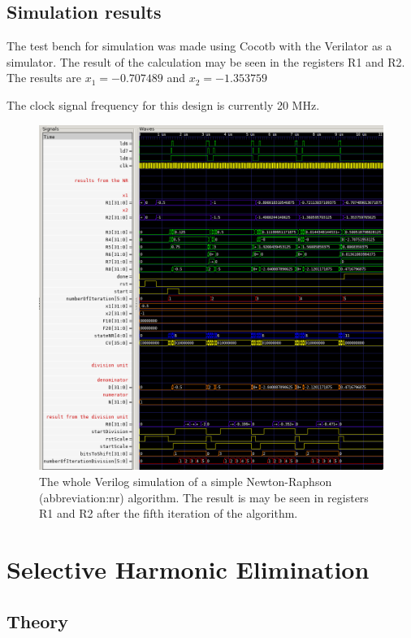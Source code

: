 \documentclass[a4paper, twoside, 11pt]{article}
\begin{document}
    \subsection{Simulation results}
        The test bench for simulation was made using Cocotb \cite{cocotb} with the Verilator \cite{verilator} as a simulator. The result of the calculation may be seen in the registers R1 and R2. The results are $x_1 = - 0.707489$ and $x_2 = - 1.353759$\par
        The clock signal frequency for this design is currently 20 MHz.
            \begin{figure}[htbp!]
                \centering
                \includegraphics[width=1\textwidth]{src/png/simple-nr-sim.png}
                \caption{The whole Verilog simulation of a simple Newton-Raphson (\gls{abbreviation:nr}) algorithm. The result is may be seen in registers R1 and R2 after the fifth iteration of the algorithm.}
                \label{fig:simple-nr-sim}
            \end{figure}



\section{Selective Harmonic Elimination}
    \subsection{Theory}\label{subsec:theory}
\end{document}
